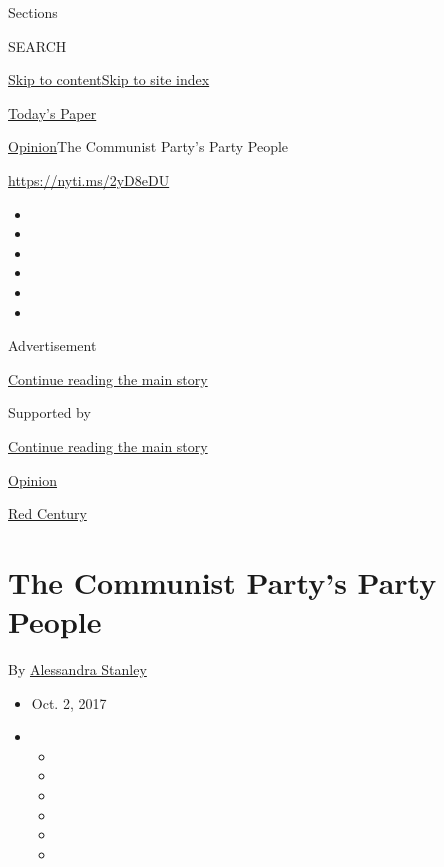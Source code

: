 Sections

SEARCH

\protect\hyperlink{site-content}{Skip to
content}\protect\hyperlink{site-index}{Skip to site index}

\href{https://myaccount.nytimes.com/auth/login?response_type=cookie\&client_id=vi}{}

\href{https://www.nytimes.com/section/todayspaper}{Today's Paper}

\href{/section/opinion}{Opinion}\textbar{}The Communist Party's Party
People

\href{https://nyti.ms/2yD8eDU}{https://nyti.ms/2yD8eDU}

\begin{itemize}
\item
\item
\item
\item
\item
\item
\end{itemize}

Advertisement

\protect\hyperlink{after-top}{Continue reading the main story}

Supported by

\protect\hyperlink{after-sponsor}{Continue reading the main story}

\href{/section/opinion}{Opinion}

\href{/column/red-century}{Red Century}

\hypertarget{the-communist-partys-party-people}{%
\section{The Communist Party's Party
People}\label{the-communist-partys-party-people}}

By \href{http://www.nytimes.com/by/alessandra-stanley}{Alessandra
Stanley}

\begin{itemize}
\item
  Oct. 2, 2017
\item
  \begin{itemize}
  \item
  \item
  \item
  \item
  \item
  \item
  \end{itemize}
\end{itemize}

